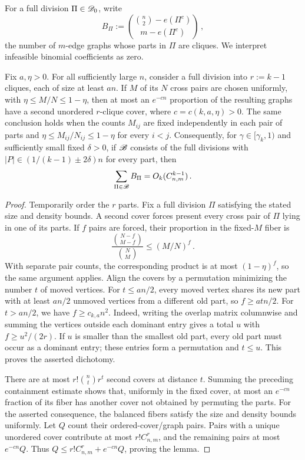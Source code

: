 For a full division $\Pi\in{\mathscr D}_0$, write
$$B_\Pi:=\binom{\binom n2-e(\Pi^c)}{m-e(\Pi^c)}\,,$$
the number of $m$-edge graphs whose parts in $\Pi$ are cliques. We interpret infeasible binomial coefficients as zero.

\begin{lemma}\label{lemma:balanced-cover-multiplicity-K1k}
Fix $a,\eta>0$. For all sufficiently large $n$, consider a full division into $r:=k-1$ cliques, each of size at least $an$. If $M$ of its $N$ cross pairs are chosen uniformly, with $\eta\leq M/N\leq1-\eta$, then at most an $e^{-cn}$ proportion of the resulting graphs have a second unordered $r$-clique cover, where $c=c(k,a,\eta)>0$. The same conclusion holds when the counts $M_{ij}$ are fixed independently in each pair of parts and $\eta\leq M_{ij}/N_{ij}\leq1-\eta$ for every $i<j$. Consequently, for $\gamma\in[\gamma_k,1)$ and sufficiently small fixed $\delta>0$, if ${\mathscr B}$ consists of the full divisions with $|P|\in(1/(k-1)\pm2\delta)n$ for every part, then
$$\sum_{\Pi\in{\mathscr B}}B_\Pi=O_k(C^{k-1}_{n,m})\,.$$
\end{lemma}
\begin{proof}
Temporarily order the $r$ parts. Fix a full division $\Pi$ satisfying the stated size and density bounds. A second cover forces present every cross pair of $\Pi$ lying in one of its parts. If $f$ pairs are forced, their proportion in the fixed-$M$ fiber is
$$\frac{\binom{N-f}{M-f}}{\binom NM}\leq(M/N)^f\,.$$
With separate pair counts, the corresponding product is at most $(1-\eta)^f$, so the same argument applies.
Align the covers by a permutation minimizing the number $t$ of moved vertices. For $t\leq an/2$, every moved vertex shares its new part with at least $an/2$ unmoved vertices from a different old part, so $f\geq atn/2$. For $t>an/2$, we have $f\geq c_{k,a}n^2$. Indeed, writing the overlap matrix columnwise and summing the vertices outside each dominant entry gives a total $u$ with $f\geq u^2/(2r)$. If $u$ is smaller than the smallest old part, every old part must occur as a dominant entry; these entries form a permutation and $t\leq u$. This proves the asserted dichotomy.

There are at most $r!\binom nt r^t$ second covers at distance $t$. Summing the preceding containment estimate shows that, uniformly in the fixed cover, at most an $e^{-cn}$ fraction of its fiber has another cover not obtained by permuting the parts. For the asserted consequence, the balanced fibers satisfy the size and density bounds uniformly. Let $Q$ count their ordered-cover/graph pairs. Pairs with a unique unordered cover contribute at most $r!C^r_{n,m}$, and the remaining pairs at most $e^{-cn}Q$. Thus $Q\leq r!C^r_{n,m}+e^{-cn}Q$, proving the lemma.
\end{proof}

